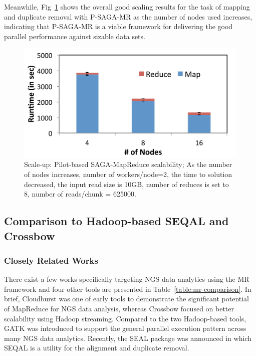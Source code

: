 \documentclass{sig-alternate}
\begin{document}
Meanwhile, Fig~\ref{fig:scale-p-saga-mr} shows the overall good scaling results for the task of mapping and duplicate removal with P-SAGA-MR as the number of nodes used increases, indicating that P-SAGA-MR is a viable framework for delivering the good parallel performance against sizable data sets.





\begin{figure}
 \centering
\includegraphics[scale=0.50]{figures/pj-smr-scale.pdf}
\caption{\small Scale-up: Pilot-based SAGA-MapReduce scalability; As the number of nodes increases, number of workers/node=2, the time to solution decreased, the input read size is 10GB, number of reduces is set to 8, number of reads/chunk = 625000. }
  \label{fig:scale-p-saga-mr} 
\end{figure}


\subsection{Comparison to Hadoop-based SEQAL and Crossbow}
\subsubsection{Closely Related Works}
There exist a few works specifically targeting NGS data analytics using the MR framework and four other tools are presented in Table~\ref{table:mr-comparison}.  In brief, Cloudburst was one of early tools to demonstrate the significant potential of MapReduce for NGS data analysis, whereas Crossbow focused on better scalability using Hadoop streaming.  Compared to the two Hadoop-based tools, GATK was introduced to support the general parallel execution pattern across many NGS data analytics.  Recently, the SEAL package was announced in which SEQAL is a utility for the alignment and duplicate removal.   
\end{document}
